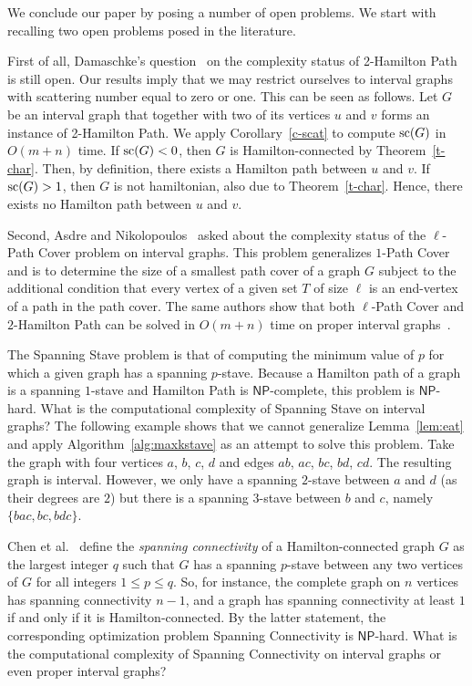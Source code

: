 \documentclass{llncs}
\DeclareMathOperator{\scat}{{\rm sc}}
\newcommand{\NP}{{\mathsf{NP}}}
\begin{document}
We conclude our paper by posing a number of open problems. We start with recalling two open problems posed in the literature.

First of all, Damaschke's question~\cite{Da93} on the complexity status of 2-{\sc Hamilton Path} is still open. Our results imply 
that we may restrict ourselves to interval graphs with scattering number equal to zero or one. This can be seen as follows. Let $G$ be an interval graph that together with two of its vertices $u$ and $v$ forms an instance
of 2-{\sc Hamilton Path}. We apply Corollary~\ref{c-scat} to compute $\scat(G)$ in $O(m+n)$ time. If $\scat(G)<0$, then $G$ is Hamilton-connected by Theorem~\ref{t-char}. Then, by definition, there exists a Hamilton path between
$u$ and $v$. If $\scat(G)>1$, then $G$ is not hamiltonian, also due to Theorem~\ref{t-char}. Hence, there exists no Hamilton path between $u$ and $v$.

Second, Asdre and Nikolopoulos~\cite{AN10} asked about the complexity status of the $\ell$-{\sc Path Cover} problem on interval graphs.
This problem generalizes $1$-{\sc Path Cover} and is to determine the size of a smallest path cover of a graph $G$ subject to the additional condition that every vertex of a given set $T$ of size $\ell$ is 
an end-vertex of a path in the path cover. The same authors show that both {\sc $\ell$-Path Cover} and $2$-{\sc Hamilton Path} can be solved in $O(m+n)$ time on proper interval graphs~\cite{AN10a}. 

The {\sc Spanning Stave} problem is that of computing the minimum value of $p$ for which a given graph has a spanning $p$-stave.
Because a Hamilton path of a graph is a  spanning $1$-stave and {\sc Hamilton Path} is $\NP$-complete, this problem is $\NP$-hard. What is the computational complexity of
{\sc Spanning Stave} on interval graphs? The following example shows that we cannot generalize Lemma~\ref{lem:eat} and apply Algorithm~\ref{alg:maxkstave} as an attempt to solve this problem.
Take the graph with four vertices $a$, $b$, $c$, $d$ and edges $ab$, $ac$, $bc$, $bd$, $cd$. The resulting graph is interval.  
However, we only have a spanning $2$-stave between $a$ and $d$ (as their degrees are $2$) but there is a spanning $3$-stave between $b$ and $c$, namely
$\{bac,bc,bdc\}$. 

Chen et al.~\cite{CCLLW} define the {\em spanning connectivity\/} of a Hamilton-connected graph $G$ as the largest integer $q$ such that $G$ has a spanning $p$-stave between any two vertices of $G$ for all integers $1\le p \le q$. So, for instance, the complete graph on $n$ vertices has spanning connectivity $n-1$, and a graph has spanning connectivity at least $1$ if and only if it is Hamilton-connected.
By the latter statement, the corresponding optimization problem {\sc Spanning Connectivity} is $\NP$-hard.
What is the computational complexity of {\sc Spanning Connectivity} on interval graphs or even proper interval graphs?
\end{document}
